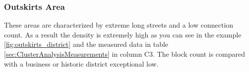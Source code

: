 \subsubsection{Outskirts Area}
\label{sec:outskits}
These areas are characterized by extreme long streets and a low connection count. As a result the density is extremely high as you can see in the example \ref{fig:outskirts_district} and the measured data in table \ref{sec:ClusterAnalysisMeasurements} in column C3. The block count is compared with a business or historic district exceptional low.